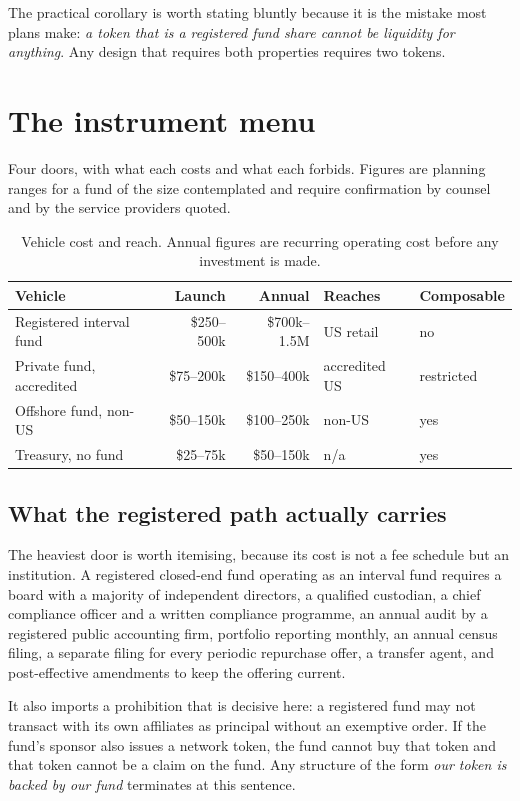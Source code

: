 \documentclass[11pt,a4paper]{article}
\begin{document}
The practical corollary is worth stating bluntly because it is the mistake most
plans make: \emph{a token that is a registered fund share cannot be liquidity for
anything}. Any design that requires both properties requires two tokens.

\section{The instrument menu}

Four doors, with what each costs and what each forbids. Figures are planning
ranges for a fund of the size contemplated and require confirmation by counsel and
by the service providers quoted.

\begin{table}[h]
\centering
\begin{tabularx}{\textwidth}{lrrXX}
\toprule
Vehicle & Launch & Annual & Reaches & Composable \\
\midrule
Registered interval fund & \$250--500k & \$700k--1.5M & US retail & no \\
Private fund, accredited & \$75--200k & \$150--400k & accredited US & restricted \\
Offshore fund, non-US & \$50--150k & \$100--250k & non-US & yes \\
Treasury, no fund & \$25--75k & \$50--150k & n/a & yes \\
\bottomrule
\end{tabularx}
\caption{Vehicle cost and reach. Annual figures are recurring operating cost
before any investment is made.}
\end{table}

\subsection{What the registered path actually carries}

The heaviest door is worth itemising, because its cost is not a fee schedule but
an institution. A registered closed-end fund operating as an interval fund
requires a board with a majority of independent directors, a qualified custodian,
a chief compliance officer and a written compliance programme, an annual audit by
a registered public accounting firm, portfolio reporting monthly, an annual
census filing, a separate filing for every periodic repurchase offer, a transfer
agent, and post-effective amendments to keep the offering current.

It also imports a prohibition that is decisive here: a registered fund may not
transact with its own affiliates as principal without an exemptive order. If the
fund's sponsor also issues a network token, the fund cannot buy that token and
that token cannot be a claim on the fund. Any structure of the form \emph{our
token is backed by our fund} terminates at this sentence.
\end{document}
